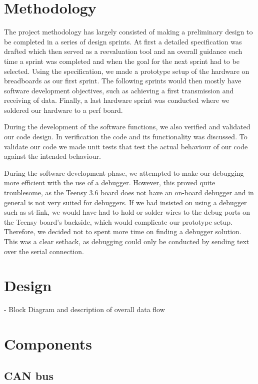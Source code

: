 \documentclass[conference]{IEEEtran}
\begin{document}
\section{Methodology}
The project methodology has largely consisted of making a preliminary design to be completed in a series of design sprints. At first a detailed specification was drafted which then served as a reevaluation tool and an overall guidance each time a sprint was completed and when the goal for the next sprint had to be selected. Using the specification, we made a prototype setup of the hardware on breadboards as our first sprint. The following sprints would then mostly have software development objectives, such as achieving a first transmission and receiving of data. Finally, a last hardware sprint was conducted where we soldered our hardware to a perf board.

During the development of the software functions, we also verified and validated our code design. In verification the code and its functionality was discussed. To validate our code we made unit tests that test the actual behaviour of our code against the intended behaviour.

During the software development phase, we attempted to make our debugging more efficient with the use of a debugger. However, this proved quite troublesome, as the Teensy 3.6 board does not have an on-board debugger and in general is not very suited for debuggers. If we had insisted on using a debugger such as st-link, we would have had to hold or solder wires to the debug ports on the Teensy board's backside, which would complicate our prototype setup. Therefore, we decided not to spent more time on finding a debugger solution. This was a clear setback, as debugging could only be conducted by sending text over the serial connection.

\section{Design}
- Block Diagram and description of overall data flow

\section{Components}
\subsection{CAN bus}
\end{document}
